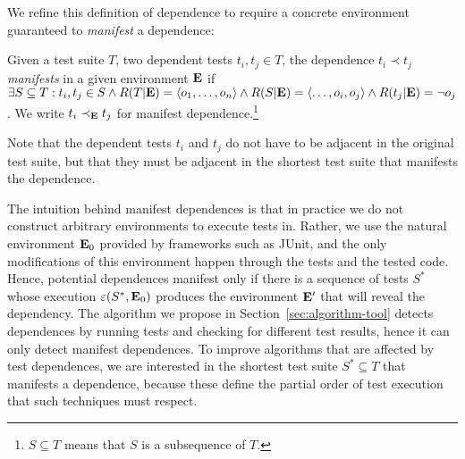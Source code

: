 We refine this definition of dependence to require a concrete environment guaranteed
to \emph{manifest} a dependence:
\begin{definition} \label{def:manifest}
Given a test suite\/ $T$, two dependent tests\/ $t_i, t_j \in T$,
the dependence\/ $t_i \prec t_j$ \emph{manifests} in a given
environment\/
$\mathbf{E}$ if\/ $\exists {S \subseteq T}: t_i, t_j \in S \wedge
R(T|\mathbf{E})
=  \langle o_1, \dots, o_n \rangle  \wedge R(S|\mathbf{E}) =
 \langle \dots,o_i,o_j \rangle  \wedge R(t_j|\mathbf{E}) = \neg o_j$. We
write\/ $t_i \prec_{\mathbf{E}} t_j$ for manifest dependence.\footnote{$S \subseteq T$ means that $S$ is a subsequence of
$T$.}
\end{definition}

Note that the dependent tests $t_i$\/ and $t_j$ do not have to be
adjacent in the original test suite, but that they must be adjacent in
the shortest test suite that manifests the dependence.

The intuition behind manifest dependences is that in practice we
do not construct arbitrary environments to execute tests in. Rather,
we use the natural environment $\mathbf{E}_0$ provided by frameworks such as JUnit,
and the only modifications of this environment happen through the
tests and the tested code. Hence, potential dependences manifest only
if there is a sequence of tests $S^*$ whose execution
$\varepsilon(S^*,\mathbf{E}_0)$  produces the
environment $\mathbf{E}'$ that will reveal the dependency.
The algorithm we propose in Section~\ref{sec:algorithm-tool} detects
dependences by running tests and checking for different test results,
hence it can only detect manifest dependences.
%
To improve algorithms that are affected by test dependences, we are
interested in the shortest test suite $S^* \subseteq T$ that manifests a
dependence, because these define the partial order of test execution
that such techniques must respect.

